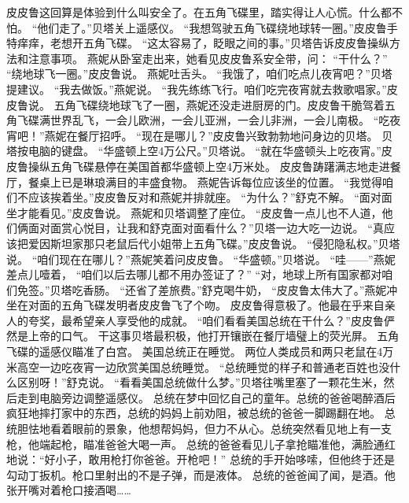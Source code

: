 \documentclass[a4paper,12pt,UTF8,twoside]{ctexbook}
\begin{document}
        皮皮鲁这回算是体验到什么叫安全了。在五角飞碟里，踏实得让人心慌。什么都不怕。 
        “他们走了。”贝塔关上遥感仪。 
        “我想驾驶五角飞碟绕地球转一圈。”皮皮鲁手特痒痒，老想开五角飞碟。 
        “这太容易了，眨眼之间的事。”贝塔告诉皮皮鲁操纵方法和注意事项。 
        燕妮从卧室走出来，她看见皮皮鲁系安全带，问： 
        “干什么？” 
        “绕地球飞一圈。”皮皮鲁说。 
        燕妮吐舌头。 
        “我饿了，咱们吃点儿夜宵吧？”贝塔提建议。 
        “我去做饭。”燕妮说。 
        “我先练练飞行。咱们吃完夜宵就去救歌唱家。”皮皮鲁说。 
        五角飞碟绕地球飞了一圈，燕妮还没走进厨房的门。皮皮鲁干脆驾着五角飞碟满世界乱飞，一会儿欧洲，一会儿亚洲，一会儿非洲，一会儿南极。 
        “吃夜宵吧！”燕妮在餐厅招呼。 
        “现在是哪儿？”皮皮鲁兴致勃勃地问身边的贝塔。 
        贝塔按电脑的键盘。 
        “华盛顿上空4万公尺。”贝塔说。 
        “就在华盛顿头上吃夜宵。”皮皮鲁操纵五角飞碟悬停在美国首都华盛顿上空4万米处。 
        皮皮鲁踌躇满志地走进餐厅，餐桌上已是琳琅满目的丰盛食物。 
        燕妮告诉每位应该坐的位置。 
        “我觉得咱们不应该挨着坐。”皮皮鲁反对和燕妮并排就座。 
        “为什么？”舒克不解。 
        “面对面坐才能看见。”皮皮鲁说。 
        燕妮和贝塔调整了座位。 
        “皮皮鲁一点儿也不人道，他们俩面对面赏心悦目，让我和舒克面对面看什么？”贝塔一边大吃一边说。 
        “真应该把爱因斯坦家那只老鼠后代小姐带上五角飞碟。”皮皮鲁说。 
        “侵犯隐私权。”贝塔说。 
        “咱们现在在哪儿？”燕妮笑着问皮皮鲁。 
        “华盛顿。”贝塔说。 
        “哇——”燕妮差点儿噎着，  “咱们以后去哪儿都不用办签证了？” 
        “对，地球上所有国家都对咱们免签。”贝塔吃香肠。 
        “还省了差旅费。”舒克喝牛奶， 
        “皮皮鲁太伟大了。”燕妮冲坐在对面的五角飞碟发明者皮皮鲁飞了个吻。 
        皮皮鲁得意极了。他最在乎来自亲人的夸奖，最希望亲人享受他的成就。 
        “咱们看看美国总统在干什么？”皮皮鲁俨然是上帝的口气。 
        干这事贝塔最积极，他打开镶嵌在餐厅墙璧上的荧光屏。 
        五角飞碟的遥感仪瞄准了白宫。 
        美国总统正在睡觉。 
        两位人类成员和两只老鼠在4万米高空一边吃夜宵一边欣赏美国总统睡觉。 
        “总统睡觉的样子和普通老百姓也没什么区别呀！”舒克说。 
        “看看美国总统做什么梦。”贝塔往嘴里塞了一颗花生米，然后走到电脑旁边调整遥感仪。 
        总统在梦中回忆自己的童年。总统的爸爸喝醉酒后疯狂地摔打家中的东西，总统的妈妈上前劝阻，被总统的爸爸一脚踢翻在地。 
        总统胆怯地看着眼前的景象，他想帮妈妈，但力不从心。总统突然看见地上有一支枪，他端起枪，瞄准爸爸大喝一声。 
        总统的爸爸看见儿子拿抢瞄准他，满脸通红地说：“好小子，敢用枪打你爸爸。开枪吧！” 
        总统的手开始哆嗦，但他终于还是勾动丁扳机。枪口里射出的不是子弹，而是液体。 
        总统的爸爸闻了闻，是酒。他张开嘴对着枪口接酒喝…… 
\end{document}
